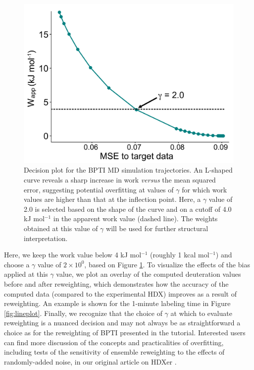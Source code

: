 \documentclass[9pt,tutorial,ASAPversion]{livecoms}
\begin{document}
\begin{figure}
    \includegraphics[width=0.98\linewidth]{Fig4_BPTI_decision_plot_LFv2.pdf}
    \caption{Decision plot for the BPTI MD simulation trajectories. An L-shaped curve reveals a sharp increase in work \textit{versus} the mean squared error, suggesting potential overfitting at values of $\gamma$ for which work values are higher than that at the inflection point. Here, a $\gamma$ value of 2.0 is selected based on the shape of the curve and on a cutoff of 4.0 kJ mol$^{-1}$ in the apparent work value (dashed line). The weights obtained at this value of $\gamma$ will be used for further structural interpretation.}
    \label{fig:decision_plot}
\end{figure}

Here, we keep the work value below 4 kJ mol$^{-1}$ (roughly 1 kcal mol$^{-1}$) and choose a $\gamma$ value of $2\times10^0$, based on Figure \ref{fig:decision_plot}.
To visualize the effects of the bias applied at this $\gamma$ value, we plot an overlay of the computed deuteration values before and after reweighting, which demonstrates how the accuracy of the computed data (compared to the experimental HDX) improves as a result of reweighting.
An example is shown for the 1-minute labeling time in Figure \ref{fig:lineplot}.
Finally, we recognize that the choice of $\gamma$ at which to evaluate reweighting is a nuanced decision and may not always be as straightforward a choice as for the reweighting of BPTI presented in the tutorial.
Interested users can find more discussion of the concepts and practicalities of overfitting, including tests of the sensitivity of ensemble reweighting to the effects of randomly-added noise, in our original article on HDXer \cite{Bradshaw2020}.
\end{document}

